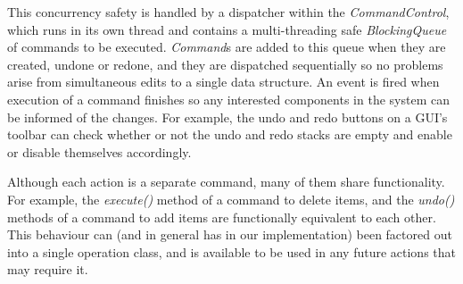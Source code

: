 \documentclass{acm_proc_article-sp}
\begin{document}
{This concurrency safety is handled by a dispatcher within the {\textit{CommandControl}}, which runs in its own thread and contains a multi-threading safe {\textit{BlockingQueue}} of commands to be executed. {\textit{Command}}s are added to this queue when they are created, undone or redone, and they are dispatched sequentially so no problems arise from simultaneous edits to a single data structure. An event is fired when execution of a command finishes so any interested components in the system can be informed of the changes. For example, the undo and redo buttons on a GUI's toolbar can check whether or not the undo and redo stacks are empty and enable or disable themselves accordingly.

Although each action is a separate command, many of them share functionality. For example, the {\textit{execute()}} method of a command to delete items, and the {\textit{undo()}} methods of a command to add items are functionally equivalent to each other. This behaviour can (and in general has in our implementation) been factored out into a single operation class, and is available to be used in any future actions that may require it.
}
\end{document}
